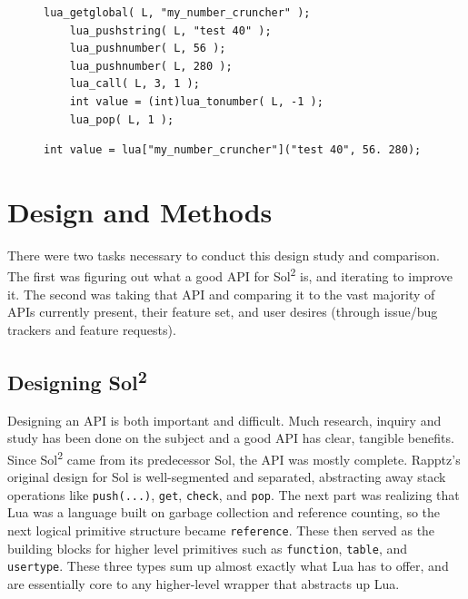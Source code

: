 \documentclass[conference,compsoc]{IEEEtran}
\newcommand{\soltwo}{Sol\textsuperscript{2}}
\begin{document}
\begin{figure}[ht!]
	\begin{lstlisting}[caption={Lua C API to call a function with 3 arguments and a single return value.}, 
	label={lst:function-call-lua}]
	lua_getglobal( L, "my_number_cruncher" );
	lua_pushstring( L, "test 40" );
	lua_pushnumber( L, 56 );
	lua_pushnumber( L, 280 );
	lua_call( L, 3, 1 );
	int value = (int)lua_tonumber( L, -1 );
	lua_pop( L, 1 );
	\end{lstlisting}
	\begin{lstlisting}[caption={Use of \soltwo{} to do exactly the same as \cref{lst:function-call-lua}.}, 
	label={lst:function-call-sol2}]
	int value = lua["my_number_cruncher"]("test 40", 56. 280);
	\end{lstlisting}
\end{figure}

\section{Design and Methods}

There were two tasks necessary to conduct this design study and comparison. The first was figuring out what a good API for \soltwo{} is, and iterating to improve it. The second was taking that API and comparing it to the vast majority of APIs currently present, their feature set, and user desires (through issue/bug trackers and feature requests).


\subsection{Designing \soltwo{}}

Designing an API is both important and difficult. Much research, inquiry and study has been done on the subject and a good API has clear, tangible benefits\cite{api-design}\cite{good-api}. Since \soltwo{} came from its predecessor Sol, the API was mostly complete. Rapptz's original design for Sol is well-segmented and separated, abstracting away stack operations like \lstinline|push(...)|, \lstinline|get|, \lstinline|check|, and \lstinline|pop|. The next part was realizing that Lua was a language built on garbage collection and reference counting, so the next logical primitive structure became \lstinline|reference|. These then served as the building blocks for higher level primitives such as \lstinline|function|, \lstinline|table|, and \lstinline|usertype|. These three types sum up almost exactly what Lua has to offer, and are essentially core to any higher-level wrapper that abstracts up Lua.
\end{document}
